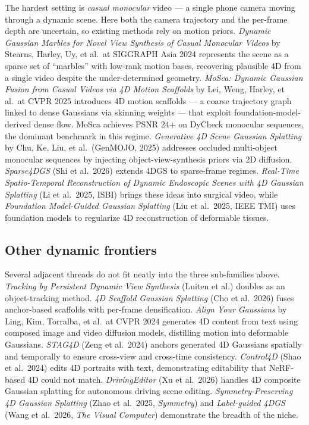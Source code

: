 \documentclass{article}
\begin{document}
The hardest setting is \emph{casual monocular} video --- a single phone camera moving through a dynamic scene. Here both the camera trajectory and the per-frame depth are uncertain, so existing methods rely on motion priors. \emph{Dynamic Gaussian Marbles for Novel View Synthesis of Casual Monocular Videos} by Stearns, Harley, Uy, et al.~at SIGGRAPH Asia 2024 \cite{stearns2024dynamicgaussianmar} represents the scene as a sparse set of ``marbles'' with low-rank motion bases, recovering plausible 4D from a single video despite the under-determined geometry. \emph{MoSca: Dynamic Gaussian Fusion from Casual Videos via 4D Motion Scaffolds} by Lei, Weng, Harley, et al.~at CVPR 2025 \cite{lei2025moscadynamicgaussi} introduces 4D motion scaffolds --- a coarse trajectory graph linked to dense Gaussians via skinning weights --- that exploit foundation-model-derived dense flow. MoSca achieves PSNR \(24\)+ on DyCheck monocular sequences, the dominant benchmark in this regime. \emph{Generative 4D Scene Gaussian Splatting} by Chu, Ke, Liu, et al.~(GenMOJO, 2025) addresses occluded multi-object monocular sequences by injecting object-view-synthesis priors via 2D diffusion. \emph{Sparse4DGS} (Shi et al.~2026) extends 4DGS to sparse-frame regimes. \emph{Real-Time Spatio-Temporal Reconstruction of Dynamic Endoscopic Scenes with 4D Gaussian Splatting} (Li et al.~2025, ISBI) brings these ideas into surgical video, while \emph{Foundation Model-Guided Gaussian Splatting} (Liu et al.~2025, IEEE TMI) uses foundation models to regularize 4D reconstruction of deformable tissues.

\subsection{Other dynamic frontiers}\label{other-dynamic-frontiers}

Several adjacent threads do not fit neatly into the three sub-families above. \emph{Tracking by Persistent Dynamic View Synthesis} (Luiten et al.) doubles as an object-tracking method. \emph{4D Scaffold Gaussian Splatting} (Cho et al.~2026) fuses anchor-based scaffolds with per-frame densification. \emph{Align Your Gaussians} by Ling, Kim, Torralba, et al.~at CVPR 2024 \cite{ling2024alignyourgaussians} generates 4D content from text using composed image and video diffusion models, distilling motion into deformable Gaussians. \emph{STAG4D} (Zeng et al.~2024) anchors generated 4D Gaussians spatially and temporally to ensure cross-view and cross-time consistency. \emph{Control4D} (Shao et al.~2024) edits 4D portraits with text, demonstrating editability that NeRF-based 4D could not match. \emph{DrivingEditor} (Xu et al.~2026) handles 4D composite Gaussian splatting for autonomous driving scene editing. \emph{Symmetry-Preserving 4D Gaussian Splatting} (Zhao et al.~2025, \emph{Symmetry}) and \emph{Label-guided 4DGS} (Wang et al.~2026, \emph{The Visual Computer}) demonstrate the breadth of the niche.
\end{document}
